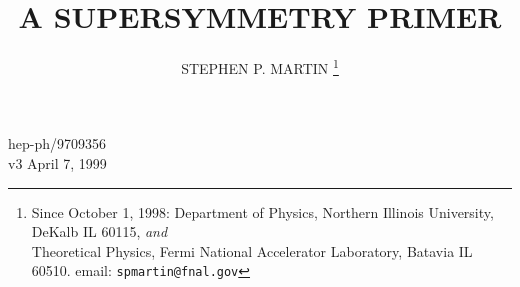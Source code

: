 \def\centeron#1#2{{\setbox0=\hbox{#1}\setbox1=\hbox{#2}\ifdim
\wd1>\wd0\kern.5\wd1\kern-.5\wd0\fi
\copy0\kern-.5\wd0\kern-.5\wd1\copy1\ifdim\wd0>\wd1
\kern.5\wd0\kern-.5\wd1\fi}}
\def\ltap{\;\centeron{\raise.35ex\hbox{$<$}}{\lower.65ex\hbox{$\sim$}}\;}
\def\gtap{\;\centeron{\raise.35ex\hbox{$>$}}{\lower.65ex\hbox{$\sim$}}\;}
\def\gsim{\mathrel{\gtap}}
\def\lsim{\mathrel{\ltap}}

\def\slashchar#1{\setbox0=\hbox{$#1$}           %
   \dimen0=\wd0                                 %
   \setbox1=\hbox{/} \dimen1=\wd1               %
   \ifdim\dimen0>\dimen1                        %
      \rlap{\hbox to \dimen0{\hfil/\hfil}}      %
      #1                                        %
   \else                                        %
      \rlap{\hbox to \dimen1{\hfil$#1$\hfil}}   %
      /                                         %
   \fi}                                        %

\setcounter{tocdepth}{2}


\setcounter{footnote}{1}
\begin{flushright}
{\large
hep-ph/9709356 \\
v3 April 7, 1999\\
}
\end{flushright}
\vspace{0.25in}

\title{A SUPERSYMMETRY PRIMER}

\author{ STEPHEN P. MARTIN 
\footnote{Since October 1, 1998: 
Department of Physics, Northern Illinois University, DeKalb IL 60115,
{\it and}\\
Theoretical Physics, Fermi National Accelerator Laboratory, Batavia IL
60510. email: {\tt spmartin@fnal.gov}}}
\address{Randall Physics Laboratory, University of Michigan\\
Ann Arbor MI 48109-1120 USA}

